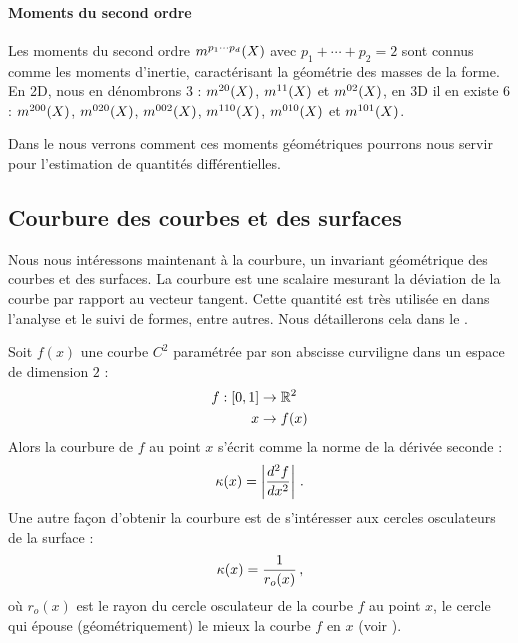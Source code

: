 \paragraph{Moments du second ordre}
%
Les moments du second ordre $m^{p_1 \cdots p_d}(X)$ avec $p_1 + \cdots +
p_2 = 2$ sont connus comme les moments d'inertie, caractérisant la géométrie des
masses de la forme. En 2D, nous en dénombrons 3 : $m^{2 0}(X)$, $m^{1
1}(X)$ et $m^{0 2}(X)$, en 3D il en existe 6 :  $m^{2 0
0}(X)$, $m^{0 2 0}(X)$, $m^{0 0 2}(X)$, $m^{1 1
0}(X)$, $m^{0 1 0}(X)$ et $m^{1 0 1}(X)$.
%

Dans le  nous verrons comment ces moments
géométriques pourrons nous servir pour l'estimation de quantités différentielles.

\subsection{Courbure des courbes et des surfaces}
%
Nous nous intéressons maintenant à la courbure, un invariant géométrique des
courbes et des surfaces. La courbure est une scalaire mesurant la déviation de
la courbe par rapport au vecteur tangent. Cette quantité est très utilisée
en \GeometryProcessing dans l'analyse et le suivi de formes, entre autres. Nous
détaillerons cela dans le .


%
%
Soit $f(x)$ une courbe $C^2$ paramétrée par son abscisse curviligne
dans un espace de dimension $2$ :
%
\begin{align}
    f : [0,1] &\rightarrow \mathbb{R}^2 \nonumber\\
    x &\rightarrow f(x)
\end{align}
%
Alors la courbure de $f$ au point $x$ s'écrit comme la norme de la dérivée
seconde :
%
\begin{equation}
  \kappa(x) = \left| \frac{d^2f}{dx^2} \right| \,.
\end{equation}
%
Une autre façon d'obtenir la courbure est de s'intéresser aux
cercles osculateurs de la surface :
%
\begin{equation}
  \kappa(x) = \frac{1}{r_o(x)} \,,
\end{equation}
%
où $r_o(x)$ est le rayon du cercle osculateur de la courbe $f$ au point $x$,
\cad le cercle qui épouse (géométriquement) le mieux la courbe $f$ en
$x$ (voir ).

